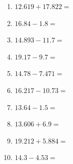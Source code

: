 \documentclass[12pt]{article}
\begin{document}
\begin{enumerate}
\newpage
\item \large $ 12.619 + 17.822 = $ \vspace{1.5cm}
\item \large $ 16.84 - 1.8 = $ \vspace{1.5cm}
\item \large $ 14.893 - 11.7 = $ \vspace{1.5cm}
\item \large $ 19.17 - 9.7 = $ \vspace{1.5cm}
\item \large $ 14.78 - 7.471 = $ \vspace{1.5cm}
\item \large $ 16.217 - 10.73 = $ \vspace{1.5cm}
\item \large $ 13.64 - 1.5 = $ \vspace{1.5cm}
\item \large $ 13.606 + 6.9 = $ \vspace{1.5cm}
\item \large $ 19.212 + 5.884 = $ \vspace{1.5cm}
\item \large $ 14.3 - 4.53 = $ \vspace{1.5cm}
\end{enumerate}\newpage
\end{document}
